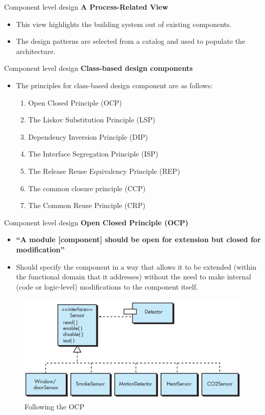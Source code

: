 \documentclass{beamer}
\begin{document}
\begin{frame}{Component level design }
	\textbf{A Process-Related View}
	\begin{itemize}
		\item This view highlights the building system out of existing components.
		\item The design patterns are selected from a catalog and used to populate the architecture.
	\end{itemize}
\end{frame}
\begin{frame}{Component level design }
	\textbf{Class-based design components}
	\begin{itemize}
		\item The principles for class-based design component are as follows:
		\begin{enumerate}
			\item Open Closed Principle (OCP)
			\item The Liskov Substitution Principle (LSP)
			\item Dependency Inversion Principle (DIP)
			\item The Interface Segregation Principle (ISP)
			\item The Release Reuse Equivalency Principle (REP)
			\item The common closure principle (CCP)
			\item The Common Reuse Principle (CRP)
		\end{enumerate}
	\end{itemize}
\end{frame}
\begin{frame}{Component level design }
	\textbf{Open Closed Principle (OCP)}
	\begin{itemize}
		\item \textbf{“A module [component] 
			should be open for extension but closed for modification”}
		\item Should specify the component in a way that allows it to be extended (within 
		the functional domain that it addresses) without the need to make internal (code 
		or logic-level) modifications to the component itself. 
	
	\end{itemize}
	\begin{figure}
	\includegraphics[scale=.46]{img/m2_48.jpg}
	\caption{Following the OCP}
\end{figure}

\end{frame}
\end{document}
